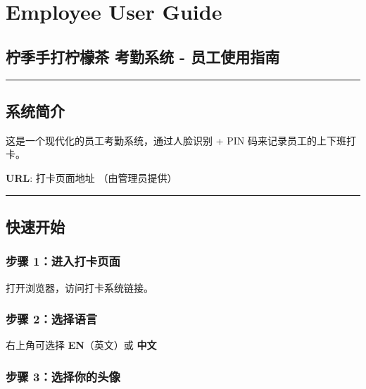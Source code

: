 \documentclass[
]{article}
\author{}
\date{\vspace{-2.5em}}
\begin{document}
\section{Employee User Guide}\label{employee-user-guide}

\subsection{柠季手打柠檬茶 考勤系统 -
员工使用指南}\label{ux67e0ux5b63ux624bux6253ux67e0ux6aacux8336-ux8003ux52e4ux7cfbux7edf---ux5458ux5de5ux4f7fux7528ux6307ux5357}

\begin{center}\rule{0.5\linewidth}{0.5pt}\end{center}

\subsection{系统简介}\label{ux7cfbux7edfux7b80ux4ecb}

这是一个现代化的员工考勤系统，通过人脸识别 + PIN
码来记录员工的上下班打卡。

\textbf{URL}: 打卡页面地址 （由管理员提供）

\begin{center}\rule{0.5\linewidth}{0.5pt}\end{center}

\subsection{快速开始}\label{ux5febux901fux5f00ux59cb}

\subsubsection{步骤
1：进入打卡页面}\label{ux6b65ux9aa4-1ux8fdbux5165ux6253ux5361ux9875ux9762}

打开浏览器，访问打卡系统链接。

\subsubsection{步骤
2：选择语言}\label{ux6b65ux9aa4-2ux9009ux62e9ux8bedux8a00}

右上角可选择 \textbf{EN}（英文）或 \textbf{中文}

\subsubsection{步骤
3：选择你的头像}\label{ux6b65ux9aa4-3ux9009ux62e9ux4f60ux7684ux5934ux50cf}
\end{document}
